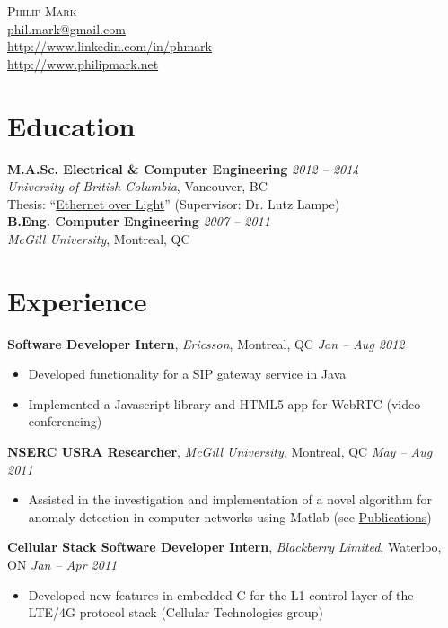 \documentclass[letterpaper]{article}
\newcommand{\contact}[4]{
  \begin{center}
    {\LARGE \textsc {#1}}\\ \smallskip
    {\href{mailto:#2}{#2}}\\ \smallskip
    {\url{#3}}\\ \smallskip
    {\url{#4}}\\ \medskip
  \end{center}
}
\newcommand{\jobtitle}[4]{
  \textbf{#1}, \emph{#2}, {#3} \hfill \emph{#4}\\
}
\newenvironment{jobdescription}{
  \vspace{-4pt}
  \begin{itemize}
  \setlength{\itemsep}{2pt}
  \setlength{\parskip}{0pt}
  \setlength{\parsep}{0pt}
}{\end{itemize}}
\begin{document}

\contact{Philip Mark}{phil.mark@gmail.com}{http://www.linkedin.com/in/phmark}
{http://www.philipmark.net}

\section*{Education}
\textbf{M.A.Sc. Electrical \& Computer Engineering}
\hfill \emph{2012 -- 2014}{} \\
\emph{University of British Columbia}, Vancouver, BC \\
Thesis: ``\href{http://circle.ubc.ca/handle/2429/51772}{Ethernet over Light}'' 
(Supervisor: Dr. Lutz Lampe) \\
\medskip 
\textbf{B.Eng. Computer Engineering} \hfill \emph{2007 -- 2011} \\
\emph{McGill University}, Montreal, QC \\

\bigskip

\section*{Experience}
\jobtitle{Software Developer Intern}{Ericsson}{Montreal, QC}{Jan -- Aug 2012}
\begin{jobdescription}
  \item Developed functionality for a SIP gateway service in Java
  \item Implemented a Javascript library and HTML5 app for WebRTC (video
  conferencing)
\end{jobdescription}

\jobtitle{NSERC USRA Researcher}{McGill University}{Montreal, QC}{May -- Aug
2011}
\begin{jobdescription}
  \item Assisted in the investigation and implementation of a novel
  algorithm for anomaly detection in computer networks using Matlab (see
  \hyperlink{sec:publications}{Publications})
\end{jobdescription}

\jobtitle{Cellular Stack Software Developer Intern}{Blackberry
Limited}{Waterloo, ON}{Jan -- Apr 2011}
\begin{jobdescription}
  \item Developed new features in embedded C for the L1 control layer of the
  LTE/4G protocol stack (Cellular Technologies group)
\end{jobdescription}
\end{document}
